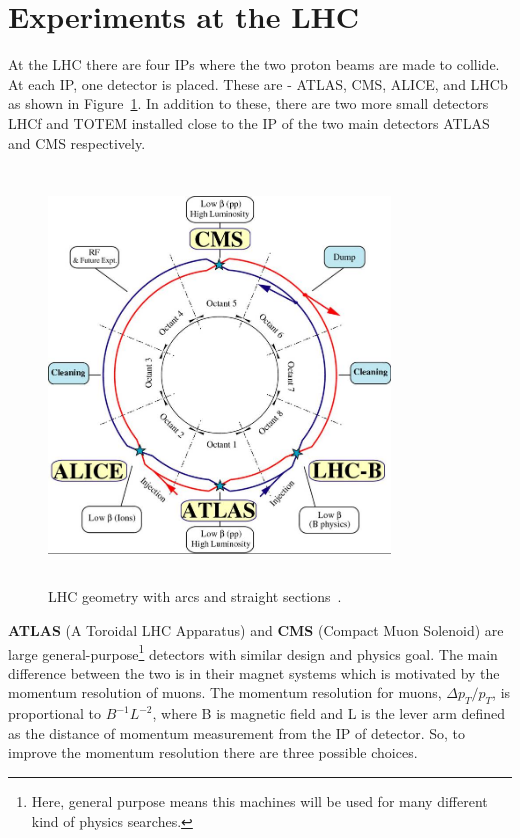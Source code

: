 \section{Experiments at the LHC} %
\label{sec:experiments_at_the_lhc}

At the LHC there are four IPs where the two proton beams are made to collide. At each IP, one detector is placed. These are - ATLAS, CMS, ALICE, and LHCb as shown in Figure~\ref{fig:LHCgeometry}. In addition to these, there are two more small detectors LHCf and TOTEM installed close to the IP of the two main detectors ATLAS and CMS respectively.
\begin{figure}[!htbp]
	\centering
	\includegraphics[width=0.81\textwidth,height=11cm]{figures/LHC/lhc-schematic.jpg}
	\caption{LHC geometry with arcs and straight sections~\cite{CERN}.}
	\label{fig:LHCgeometry}
\end{figure}
\newline
{\textbf{ATLAS}} (A Toroidal LHC Apparatus) and {\textbf{CMS}} (Compact Muon Solenoid) are large general-purpose\footnote{Here, general purpose means this machines will be used for many different kind of physics searches.} detectors with similar design and physics goal. 
The main difference between the two is in their magnet systems which is motivated by the momentum resolution of muons. 
The momentum resolution for muons, $\Delta p_T/p_T$, is proportional to  $B^{-1}L^{-2}$, where B is magnetic field and L is the lever arm defined as the distance of momentum measurement from the IP of detector. 
So, to improve the momentum resolution there are three possible choices.

